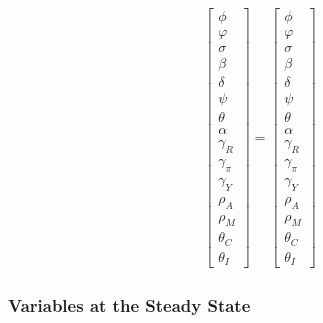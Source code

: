 \documentclass[
	12pt,
	]{article}
\numberwithin{equation}{section}
\theoremstyle{definition}
\theoremstyle{plain}
\theoremstyle{plain}
\theoremstyle{plain}
\begin{document}
\begin{center}
	
	\begin{align}
		\begin{bmatrix}
			\phi       \\
			\varphi    \\
			\sigma     \\
			\beta      \\
			\delta     \\
			\psi       \\
			\theta     \\
			\alpha     \\
			\gamma_R   \\
			\gamma_\pi \\
			\gamma_Y   \\
			\rho_A     \\
			\rho_M     \\
			\theta_C   \\
			\theta_I
		\end{bmatrix} = 
		\begin{bmatrix}
			\phi       \\
			\varphi    \\
			\sigma     \\
			\beta      \\
			\delta     \\
			\psi       \\
			\theta     \\
			\alpha     \\
			\gamma_R   \\
			\gamma_\pi \\
			\gamma_Y   \\
			\rho_A     \\
			\rho_M     \\
			\theta_C   \\
			\theta_I   
		\end{bmatrix}
	\end{align}
	
\end{center}


\subsubsection{Variables at the Steady State}
\end{document}
